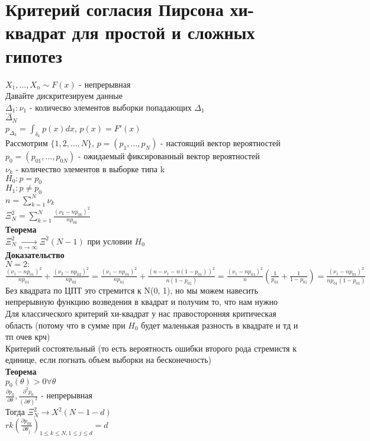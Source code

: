 \documentclass{article}
\newcommand\0{\mathbb{0}}
\newcommand\1{\mathbb{1}}
\newcommand{\xrto}{\xrightarrow}
\newcommand{\pat}{\partial}
\begin{document}
\section{Критерий согласия Пирсона хи-квадрат для простой и сложных гипотез}
$X_1, \dots, X_n \sim F(x)$ - непрерывная\\
Давайте дискритезируем данные\\
$\Delta_1: \nu_1$ - количесво элементов выборки попадающих $\Delta_1$\\
$\dots$\\
$\Delta_N$\\
$p_{\Delta_k} = \displaystyle\int_{\delta_k} p(x) dx$, $p(x) = F'(x)$\\
Рассмотрим $\{1, 2, \dots, N\}$, $p = (p_1, \dots, p_N)$ - настоящий вектор вероятностей\\
$p_0 = (p_{01}, \dots, p_{0N})$ - ожидаемый фиксированный вектор вероятностей\\
$\nu_k$ - количество элементов в выборке типа k\\
$H_0: p = p_0$\\
$H_1: p \neq p_0$\\
$n = \displaystyle\sum_{k = 1}^N \nu_k$\\
$\Xi_N^2 = \displaystyle\sum_{k = 1}^N \frac{(\nu_k - np_{0k})^2}{np_{0k}}$\\
\textbf{Теорема}\\
$\Xi_N^2 \xrto[n \to \infty]{} \Xi^2(N - 1)$ при условии $H_0$\\
\textbf{Доказательство}\\
$N = 2:$\\
$\frac{(\nu_1 - np_{01})^2}{np_{01}} + \frac{(\nu_2 - np_{02})^2}{np_{02}} = \frac{(\nu_1 - np_{01})^2}{np_{01}} + \frac{(n - \nu_1 - n(1 - p_{01}))^2}{n(1 - p_{01})} = \frac{(\nu_1 - np_{01})^2}{n}(\frac{1}{p_{01}} + \frac{1}{1 - p_{01}}) = \frac{(\nu_1 - np_{01})^2}{np_{01}(1 - p_{01})}$\\
Без квадрата по ЦПТ это стремится к N(0, 1), но мы можем навесить непрерывную функцию возведения в квадрат и получим то, что нам нужно\\
Для классического критерий хи-квадрат у нас правосторонняя критическая область (потому что в сумме при $H_0$ будет маленькая разность в квадрате и тд и тп очев крч)\\
Критерий состоятельный (то есть вероятность ошибки второго рода стремистя к единице, если погнать объем выборки на бесконечность)\\
\textbf{Теорема}\\
$p_0(\theta) > 0 \forall \theta$\\
$\frac{\pat p_0}{\pat \theta}, \frac{\pat^2 p_0}{(\pat \theta)^2}$ - непрерывная\\
Тогда $\Xi_N^2 \to X^2(N - 1 - d)$\\
$rk(\frac{\pat p_{0k}}{\pat \theta_j})_{1 \leq k \leq N, 1 \leq j \leq d} = d$\\
\end{document}
